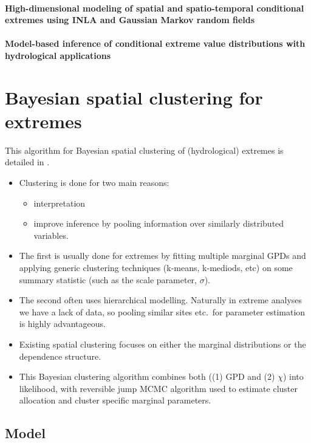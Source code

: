 \documentclass{article}
\numberwithin{equation}{section}
\begin{document}
\paragraph{High-dimensional modeling of spatial and spatio-temporal conditional extremes using INLA and Gaussian Markov random fields}

\paragraph{Model-based inference of conditional extreme value distributions with hydrological applications}

\newpage
\section{Bayesian spatial clustering for extremes} 

This algorithm for Bayesian spatial clustering of (hydrological) extremes is detailed in \cite{Rohrbeck2021}.
\begin{itemize}
  \item Clustering is done for two main reasons:
    \begin{itemize}
      \item interpretation
      \item improve inference by pooling information over similarly distributed variables.
    \end{itemize}
  \item The first is usually done for extremes by fitting multiple marginal GPDs and applying generic clustering techniques (k-means, k-mediods, etc) on some summary statistic (such as the scale parameter, $\sigma$). 
  \item The second often uses hierarchical modelling. Naturally in extreme analyses we have a lack of data, so pooling similar sites etc.\ for parameter estimation is highly advantageous. 
  \item Existing spatial clustering focuses on either the marginal distributions or the dependence structure. 
  \item This Bayesian clustering algorithm combines both ((1) GPD and (2) $\chi$) into likelihood, with reversible jump MCMC algorithm used to estimate cluster allocation and cluster specific marginal parameters. 
\end{itemize}

\subsection{Model}
\end{document}
